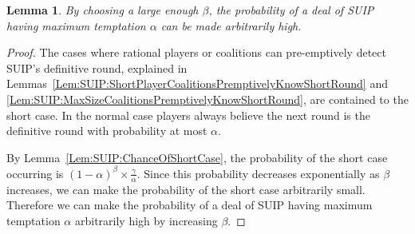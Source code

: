 \documentclass{dalcsthesis}
\newtheorem{lemma}{Lemma}
\begin{document}
\begin{lemma}\label{Lem:SUIP:HighTemptationAvoidable}By choosing a large enough $\beta$, the probability of a deal of SUIP having maximum temptation $\alpha$ can be made arbitrarily high.\end{lemma}
\begin{proof}
The cases where rational players or coalitions can pre-emptively detect SUIP's definitive round, explained in Lemmas~\ref{Lem:SUIP:ShortPlayerCoalitionsPremptivelyKnowShortRound} and \ref{Lem:SUIP:MaxSizeCoalitionsPremptivelyKnowShortRound}, are contained to the short case. In the normal case players always believe the next round is the definitive round with probability at most $\alpha$.

By Lemma~\ref{Lem:SUIP:ChanceOfShortCase}, the probability of the short case occurring is $(1-\alpha)^\beta \times \frac{\gamma}{\alpha}$. Since this probability decreases exponentially as $\beta$ increases, we can make the probability of the short case arbitrarily small. Therefore we can make the probability of a deal of SUIP having maximum temptation $\alpha$ arbitrarily high by increasing $\beta$.
\end{proof}
\end{document}
